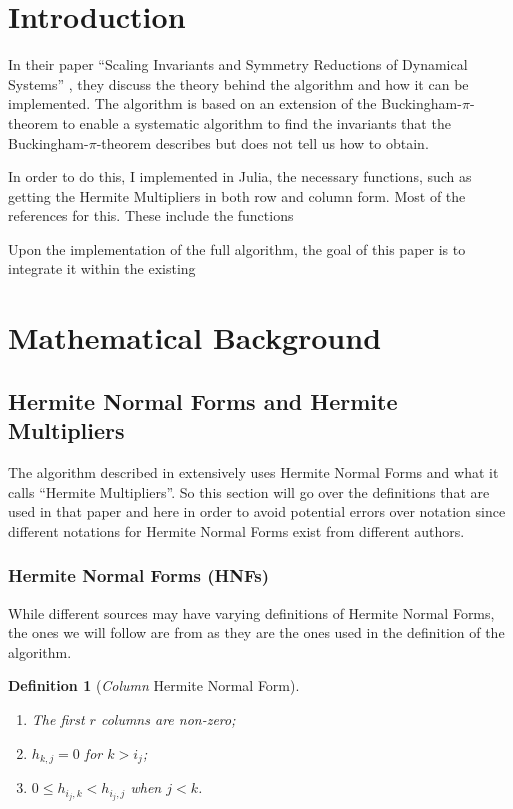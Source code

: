 \documentclass[oneside, a4paper, onecolumn, 11pt]{article}
\newtheorem{definition}{Definition}
\begin{document}
\newpage

\section{Introduction}

In their paper ``Scaling Invariants and Symmetry Reductions of Dynamical Systems'' \cite{Hubert2013}, they discuss the theory behind the algorithm and how it can be implemented. The algorithm is based on an extension of the Buckingham-\(\pi\)-theorem to enable a systematic algorithm to find the invariants that the Buckingham-\(\pi\)-theorem describes but does not tell us how to obtain.

In order to do this, I implemented in Julia, the necessary functions, such as getting the Hermite Multipliers in both row and column form. Most of the references for this. These include the functions \cite{Hubert2013}

Upon the implementation of the full algorithm, the goal of this paper is to integrate it within the existing 

\section{Mathematical Background}

\subsection{Hermite Normal Forms and Hermite Multipliers}

The algorithm described in \cite{Hubert2013} extensively uses Hermite Normal Forms and what it calls ``Hermite Multipliers''. So this section will go over the definitions that are used in that paper and here in order to avoid potential errors over notation since different notations for Hermite Normal Forms exist from different authors.

\subsubsection{Hermite Normal Forms (HNFs)}

While different sources may have varying definitions of Hermite Normal Forms, the ones we will follow are from \cite{Hubert2013} as they are the ones used in the definition of the algorithm.

\begin{definition}[\textit{Column} Hermite Normal Form]
    \begin{enumerate}[label=(\roman*)]
        \item The first \(r\) columns are non-zero;
        \item \(h_{k, j} = 0\) for \(k > i_j\);
        \item \(0 \le h_{i_j, k} < h_{i_j, j}\) when \(j < k\).
    \end{enumerate}
\end{definition}
\end{document}
